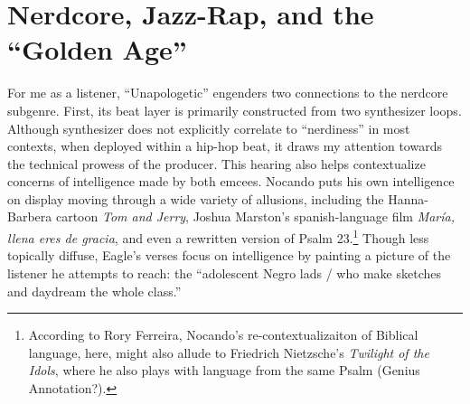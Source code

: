 \section{Nerdcore, Jazz-Rap, and the ``Golden Age''}

For me as a listener, ``Unapologetic'' engenders two connections to the nerdcore subgenre. First, its beat 
layer is primarily constructed from two synthesizer loops. Although synthesizer does not explicitly
correlate to ``nerdiness'' in most contexts, when deployed within a hip-hop beat, it draws my attention
towards the technical prowess of the producer. This hearing also helps contextualize concerns of intelligence
made by both emcees. Nocando puts his own intelligence on display moving through a wide variety of allusions, 
including the Hanna-Barbera cartoon \textit{Tom and Jerry}, Joshua Marston's spanish-language film 
\textit{María, llena eres de gracia}, and even a rewritten version of Psalm 23.\footnote{
    According to Rory Ferreira, Nocando's re-contextualizaiton of Biblical language, here, might also 
    allude to Friedrich Nietzsche's \textit{Twilight of the Idols}, where he also plays with language
    from the same Psalm (Genius Annotation?).} 
Though less topically diffuse, Eagle's verses focus on intelligence by painting a picture of the listener he
attempts to reach: the ``adolescent Negro lads / who make sketches and daydream the whole class.''

